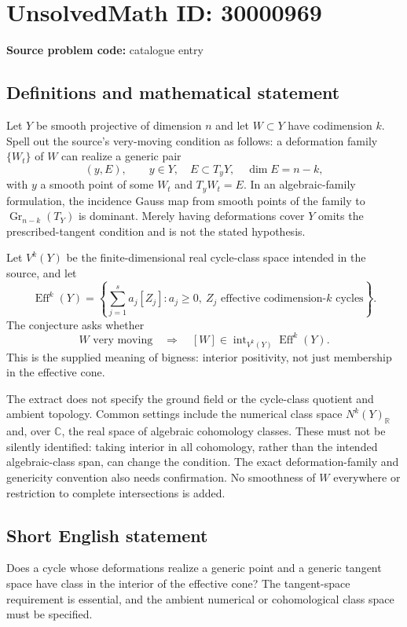 \documentclass[11pt]{article}
\newcommand{\R}{\mathbb{R}}
\newcommand{\C}{\mathbb{C}}
\begin{document}
\section*{UnsolvedMath ID: 30000969}
\textbf{Source problem code:} catalogue entry
\subsection{Definitions and mathematical statement}
Let $Y$ be smooth projective of dimension $n$ and let $W\subset Y$ have codimension $k$. Spell out the source's very-moving condition as follows: a deformation family $\{W_t\}$ of $W$ can realize a generic pair
\[
(y,E),\qquad y\in Y,\quad E\subset T_yY,\quad\dim E=n-k,
\]
with $y$ a smooth point of some $W_t$ and $T_yW_t=E$. In an algebraic-family formulation, the incidence Gauss map from smooth points of the family to $\operatorname{Gr}_{n-k}(T_Y)$ is dominant. Merely having deformations cover $Y$ omits the prescribed-tangent condition and is not the stated hypothesis.

Let $V^k(Y)$ be the finite-dimensional real cycle-class space intended in the source, and let
\[
\operatorname{Eff}^k(Y)=
\left\{\sum_{j=1}^{s}a_j[Z_j]:a_j\geq0,\ Z_j\text{ effective codimension-}k\text{ cycles}\right\}.
\]
The conjecture asks whether
\[
W\text{ very moving}\quad\Longrightarrow\quad
[W]\in\operatorname{int}_{V^k(Y)}\operatorname{Eff}^k(Y).
\]
This is the supplied meaning of bigness: interior positivity, not just membership in the effective cone.

The extract does not specify the ground field or the cycle-class quotient and ambient topology. Common settings include the numerical class space $N^k(Y)_{\R}$ and, over $\C$, the real space of algebraic cohomology classes. These must not be silently identified: taking interior in all cohomology, rather than the intended algebraic-class span, can change the condition. The exact deformation-family and genericity convention also needs confirmation. No smoothness of $W$ everywhere or restriction to complete intersections is added.
\subsection{Short English statement}
Does a cycle whose deformations realize a generic point and a generic tangent space have class in the interior of the effective cone? The tangent-space requirement is essential, and the ambient numerical or cohomological class space must be specified.
\end{document}
